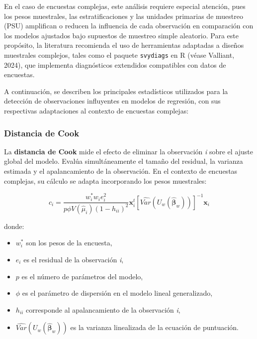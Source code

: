 \documentclass[
  12pt,
]{book}
\providecommand{\tightlist}{%
  \setlength{\itemsep}{0pt}\setlength{\parskip}{0pt}}
\begin{document}
En el caso de encuestas complejas, este análisis requiere especial atención, pues los pesos muestrales, las estratificaciones y las unidades primarias de muestreo (PSU) amplifican o reducen la influencia de cada observación en comparación con los modelos ajustados bajo supuestos de muestreo simple aleatorio. Para este propósito, la literatura recomienda el uso de herramientas adaptadas a diseños muestrales complejos, tales como el paquete \texttt{svydiags} en R (véase Valliant, 2024), que implementa diagnósticos extendidos compatibles con datos de encuestas.

A continuación, se describen los principales estadísticos utilizados para la detección de observaciones influyentes en modelos de regresión, con sus respectivas adaptaciones al contexto de encuestas complejas:

\subsubsection{Distancia de Cook}\label{distancia-de-cook}

La \textbf{distancia de Cook} mide el efecto de eliminar la observación \emph{i} sobre el ajuste global del modelo. Evalúa simultáneamente el tamaño del residual, la varianza estimada y el apalancamiento de la observación. En el contexto de encuestas complejas, su cálculo se adapta incorporando los pesos muestrales:

\[
c_{i}=\frac{w_{i}^{*}w_{i}e_{i}^{2}}{p\phi V\left(\hat{\mu}_{i}\right)\left(1-h_{ii}\right)^{2}}\boldsymbol{x}_{i}^{t}\left[\widehat{Var}\left(U_{w}\left(\hat{\boldsymbol{\beta}}_{w}\right)\right)\right]^{-1}\boldsymbol{x}_{i}
\]

donde:

\begin{itemize}
\tightlist
\item
  \(w_i^*\) son los pesos de la encuesta,
\item
  \(e_i\) es el residual de la observación \emph{i},
\item
  \(p\) es el número de parámetros del modelo,
\item
  \(\phi\) es el parámetro de dispersión en el modelo lineal generalizado,
\item
  \(h_{ii}\) corresponde al apalancamiento de la observación \emph{i},
\item
  \(\widehat{Var}\left(U_{w}\left(\hat{\boldsymbol{\beta}}_{w}\right)\right)\) es la varianza linealizada de la ecuación de puntuación.
\end{itemize}
\end{document}
